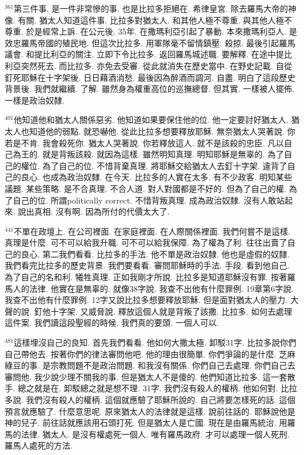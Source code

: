 \documentclass{book}
\begin{document}
$^{361}$第三件事.
是一件非常慘的事.
也是比拉多拒絕在.
希律皇宮.
除去羅馬大帝的神像.
有關.
猶太人知道這件事.
比拉多對猶太人.
和其他人極不尊重.
與其他人極不尊重.
於是經常上訴.
在公元後.
35年.
在撒瑪利亞引起了暴動.
本來撒瑪利亞人.
是效忠羅馬帝國的殖民地.
但這次比拉多.
用軍隊毫不留情鎮壓.
殺掠.
最後引起羅馬議會.
和提比利亞的關注.
立即下令比拉多.
返回羅馬城述職.
要解釋.
在途中提比利亞突然死去.
而比拉多.
亦免去受審.
從此就消失在歷史當中.
在野史記載.
自從釘死耶穌在十字架後.
日日藉酒消愁.
最後因為醉酒而調河.
自盡.
明白了這段歷史背景後.
我們就繼續.
了解.
雖然身為權重高位的巡撫總督.
但其實.
一樣被人擺佈.
一樣是政治奴隸.

$^{401}$他知道他和猶太人關係惡劣.
他知道如果要保住他的位.
他一定要討好猶太人.
猶太人也知道他的弱點.
就恐嚇他.
從此比拉多想要釋放耶穌.
無奈猶太人哭著說.
你若是不肯.
我會殺死你.
猶太人哭著說.
你若釋放這人.
就不是該殺的忠臣.
凡以自己為王的.
就是背叛該殺.
就因為這樣.
雖然明知真理.
明知耶穌是無辜的.
為了自己的權位.
為了自己的位.
不惜背棄真理.
將耶穌交給猶太人去釘十字架.
違背了自己的良心.
也成為政治奴隸.
在今天.
比拉多的人實在太多.
有不少政客.
明知某些議題.
某些策略.
是不合真理.
不合人道.
對人對國都是不好的.
但為了自己的權.
為了自己的位.
所謂politically correct.
不惜背叛真理.
成為政治奴隸.
沒有人敢站起來.
說出真相.
沒有啊.
因為所付的代價太大了.

$^{441}$不單在政壇上.
在公司裡面.
在家庭裡面.
在人際關係裡面.
我們何嘗不是這樣.
真理是什麼.
可不可以給我升職.
可不可以給我保障.
為了權為了利.
往往出賣了自己的良心.
第二我們看看.
比拉多的手法.
他不單是政治奴隸.
他也是虛假的奴隸.
我們看完比拉多的歷史背景.
我們要看看.
審問耶穌時的手法.
手段.
看到他自己.
為了自己的名和利.
犧牲真理.
正如我剛才所說.
比拉多是知道耶穌沒有罪.
按著羅馬人的法律.
他實在是無辜的.
就像38字說.
我查不出他有什麼罪例.
19章第6字說.
我查不出他有什麼罪例.
12字又說比拉多想要釋放耶穌.
但是面對猶太人的壓力.
大聲的說.
釘他十字架.
又威脅說.
釋放這個人就是背叛了該撒.
比拉多.
如何去處理這件案.
我們讀這段聖經的時候.
我們真的要頭.
一個人可以.

$^{481}$這樣埋沒自己的良知.
首先我們看看.
他如何大撒太極.
卸駁31字.
比拉多說你們自己帶他去.
按著你們的律法審問他吧.
他的理由很簡單.
你們爭論的是什麼.
芝麻綠豆的事.
是宗教問題不是政治問題.
和我沒有關係.
你們自己去處理.
你們自己去審問他.
我少說少理不關我的事.
但是猶太人不是傻的.
他們知道比拉多.
這一套散手.
總之就是在.
卸駁總之就是想不理.
31字.
我們沒有殺人的權柄.
他如何對.
比拉多說.
我們沒有殺人的權柄.
這個就應驗了耶穌所說的.
自己將要怎樣死的話.
這個預言就應驗了.
什麼意思呢.
原來猶太人的法律就是這樣.
說前往話的.
耶穌說他是神的兒子.
前往話就應該用石頭打死.
但是猶太人是亡國.
現在是由羅馬統治.
用羅馬的法律.
猶太人.
是沒有權處死一個人.
唯有羅馬政府.
才可以處理一個人死刑.
羅馬人處死的方法.
\end{document}
